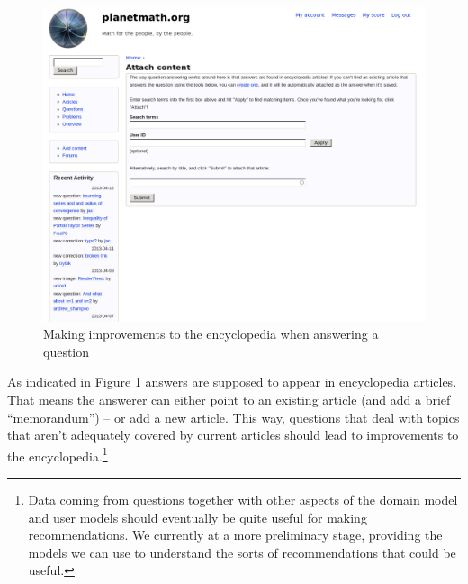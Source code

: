 \begin{vplace}[0.7]
\begin{figure}[h]
\begin{center}
\includegraphics[width=.85\textwidth]{./inputs/QuestionsPartIII.png}
\end{center}
\caption{Making improvements to the encyclopedia when answering a question \label{QuestionsPartIII}}
\end{figure}
\bigskip

As indicated in Figure \ref{QuestionsPartIII} answers are supposed to
appear in encyclopedia articles.  That means the answerer can either
point to an existing article (and add a brief ``memorandum'') -- or
add a new article.  This way, questions that deal with topics that
aren't adequately covered by current articles should lead to
improvements to the encyclopedia.\footnote{Data coming from questions
  together with other aspects of the domain model and user models
  should eventually be quite useful for making recommendations.  We
  currently at a more preliminary stage, providing the models we can
  use to understand the sorts of recommendations that could be
  useful.}
\end{vplace}

\newpage
\FloatBarrier

